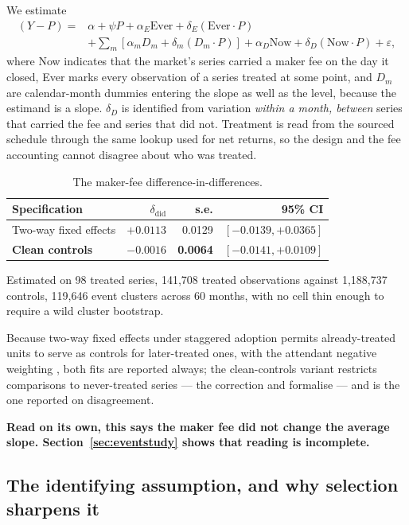 \documentclass[preprint,12pt,authoryear]{elsarticle}
\begin{document}
We estimate
\begin{align}
(Y-P) ={}& \alpha + \psi P + \alpha_E \mathrm{Ever} + \delta_E (\mathrm{Ever} \cdot P) \nonumber \\
        &+ \sum_m \left[ \alpha_m D_m + \delta_m (D_m \cdot P) \right]
         + \alpha_D \mathrm{Now} + \delta_D (\mathrm{Now} \cdot P) + \varepsilon,
\end{align}
where \textrm{Now} indicates that the market's series carried a maker fee on the
day it closed, \textrm{Ever} marks every observation of a series treated at some
point, and $D_m$ are calendar-month dummies entering the slope as well as the
level, because the estimand is a slope. $\delta_D$ is identified from variation
\emph{within a month, between} series that carried the fee and series that did
not. Treatment is read from the sourced schedule through the same lookup used
for net returns, so the design and the fee accounting cannot disagree about who
was treated.

\begin{table}[htbp]
\centering
\caption{The maker-fee difference-in-differences.}
\begin{tabular}{lrrr}
\toprule
Specification & $\delta_{\mathrm{did}}$ & s.e. & 95\% CI \\
\midrule
Two-way fixed effects & $+0.0113$ & 0.0129 & $[-0.0139, +0.0365]$ \\
\textbf{Clean controls} & \textbf{$-0.0016$} & \textbf{0.0064} & $[-0.0141, +0.0109]$ \\
\bottomrule
\end{tabular}
\end{table}

Estimated on 98 treated series, 141,708 treated observations against 1,188,737
controls, 119,646 event clusters across 60 months, with no cell thin enough to
require a wild cluster bootstrap.

Because two-way fixed effects under staggered adoption permits already-treated
units to serve as controls for later-treated ones, with the attendant negative
weighting \citep{goodmanbacon2021}, both fits are reported always; the
clean-controls variant restricts comparisons to never-treated series --- the
correction \citet{callaway2021} and \citet{sun2021} formalise --- and is the one
reported on disagreement.

\textbf{Read on its own, this says the maker fee did not change the average
slope. Section~\ref{sec:eventstudy} shows that reading is incomplete.}

\subsection{The identifying assumption, and why selection sharpens it}
\end{document}

